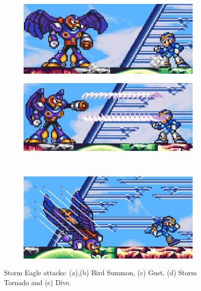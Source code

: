 \begin{figure}[h]
\begin{subfigure}{0.35\linewidth}
 		\caption{}
 	\end{subfigure}\\
	 \begin{subfigure}{0.4\linewidth}
	 	\centering
	 	\includegraphics[width=\linewidth]{figures/X1/Eagle_push.jpg}
	 	\caption{}
	 \end{subfigure}
	 \begin{subfigure}{0.4\linewidth}
	 	\centering
	 	\includegraphics[width=\linewidth]{figures/X1/Eagle_tornado.jpg}
	 	\caption{}
	 \end{subfigure}\\
 		 \begin{subfigure}{0.4\linewidth}
 		\centering
 		\includegraphics[width=\linewidth]{figures/X1/Eagle_dive.jpg}
 		\caption{}
 	\end{subfigure}
 	\caption{Storm Eagle attacks: (a),(b) Bird Summon, (c) Gust, (d) Storm Tornado and (e) Dive.}
 \end{figure}
 
